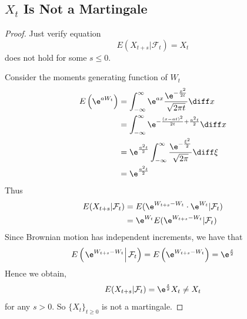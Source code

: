     \subsection{$X_t$ Is Not a Martingale}
    \begin{proof}
        Just verify equation
        \[E(X_{t+s}|\mathcal F_t)=X_t\]
        does not hold for some $s\leq 0$.

        Consider the moments generating function of $W_t$
        \begin{equation}
            \label{eq:mgf}
            \begin{aligned}
            E\left(\e^{aW_t}\right)&=\int_{-\infty}^\infty
            \e^{ax}
            \frac{\e^{-\frac{x^2}{2t}}}{\sqrt{2\pi t}}
            \diff x\\
            &=\int_{-\infty}^\infty
              \e^{-\frac{(x-at)^2}{2t}+\frac{a^2t}{2}}\diff x\\
            &=\e^{\frac{a^2t}{2}}\int_{-\infty}^\infty
              \frac{\e^{-\frac{\xi^2}{2}}}{\sqrt{2\pi}}
              \diff\xi\\
            &=\e^{\frac{a^2t}{2}}
            \end{aligned}
        \end{equation}
        Thus
        \[\begin{aligned}
            E(X_{t+s}|\mathcal F_t)&=E(\e^{W_{t+s}-W_t}\cdot\e^{W_t}|\mathcal F_t)\\
            &=\e^{W_t}E(\e^{W_{t+s}-W_t}|\mathcal F_t)
        \end{aligned}\]
        Since Brownian motion has independent increments, we have that
        \[E\left(\left.\e^{W_{t+s}-W_t}\right|\mathcal F_t\right)
        =E\left(\e^{W_{t+s}-W_t}\right)
        =\e^{\frac{s}{2}}\]
        Hence we obtain,
        \[E(X_{t+s}|\mathcal F_t)=\e^{\frac{s}{2}}X_t\neq X_t\]
        for any $s>0$. So $\{X_t\}_{t\geq 0}$ is not a martingale.

    \end{proof}

